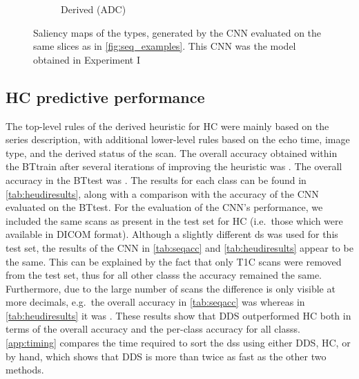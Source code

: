\begin{figure}[htbp]
\begin{subfigure}[t]{\figexamplewidth}
        \caption{Derived (ADC)}\label{fig:DWI-DCam}
    \end{subfigure}
    \caption{Saliency maps of the \glspl{type}, generated by the \gls{CNN} evaluated on the same \glspl{slice} as in \cref{fig:seq_examples}. This \gls{CNN} was the model obtained in Experiment I}\label{fig:seq_gradcam}
\end{figure}

\subsection{\acrlong{HC} predictive performance}

The top-level rules of the  derived heuristic for \gls{HC} were mainly based on the series description, with additional lower-level rules based on the echo time, image type, and the derived status of the \gls{scan}.
The overall accuracy obtained within the \gls{BTtrain} after several iterations of improving the heuristic was .
The overall accuracy in the \gls{BTtest} was .
The results for each \gls{class} can be found in \cref{tab:heudiresults}, along with a comparison with the accuracy of the \gls{CNN} evaluated on the \gls{BTtest}.
For the evaluation of the \gls{CNN}'s performance, we included the same \glspl{scan} as present in the test set for \gls{HC} (i.e.\ those which were available in \gls{DICOM} format).
Although a slightly different \gls{ds} was used for this test set, the results of the \gls{CNN} in \cref{tab:seqacc} and \cref{tab:heudiresults} appear to be the same.
This can be explained by the fact that only \gls{T1C} \glspl{scan} were removed from the test set, thus for all other \glspl{class} the accuracy remained the same.
Furthermore, due to the large number of \glspl{scan} the difference is only visible at more decimals, e.g.\ the overall accuracy in \cref{tab:seqacc} was  whereas in \cref{tab:heudiresults} it was .
These results show that \gls{DDS} outperformed \gls{HC} both in terms of the overall accuracy and the per-class accuracy for all \glspl{class}.
\cref{app:timing} compares the time required to sort the \glspl{ds} using either \gls{DDS}, \gls{HC}, or by hand, which shows that \gls{DDS} is more than twice as fast as the other two methods.

